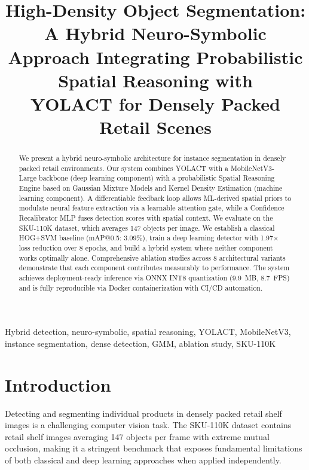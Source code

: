 \documentclass[conference]{IEEEtran}
\title{High-Density Object Segmentation: A Hybrid Neuro-Symbolic \\
       Approach Integrating Probabilistic Spatial Reasoning with \\
       YOLACT for Densely Packed Retail Scenes}
\author{
  \IEEEauthorblockN{Raman Luhach}
  \IEEEauthorblockA{
    Enrollment No: 230107\\
    Department of Computer Science
  }
  \and
  \IEEEauthorblockN{Rachit Kumar}
  \IEEEauthorblockA{
    Enrollment No: 230128\\
    Department of Computer Science
  }
}
\begin{document}
\maketitle

\begin{abstract}
We present a hybrid neuro-symbolic architecture for instance segmentation in densely packed retail environments. Our system combines YOLACT with a MobileNetV3-Large backbone (deep learning component) with a probabilistic Spatial Reasoning Engine based on Gaussian Mixture Models and Kernel Density Estimation (machine learning component). A differentiable feedback loop allows ML-derived spatial priors to modulate neural feature extraction via a learnable attention gate, while a Confidence Recalibrator MLP fuses detection scores with spatial context. We evaluate on the SKU-110K dataset, which averages 147 objects per image. We establish a classical HOG+SVM baseline (mAP@0.5: 3.09\%), train a deep learning detector with 1.97$\times$ loss reduction over 8 epochs, and build a hybrid system where neither component works optimally alone. Comprehensive ablation studies across 8 architectural variants demonstrate that each component contributes measurably to performance. The system achieves deployment-ready inference via ONNX INT8 quantization (9.9~MB, 8.7~FPS) and is fully reproducible via Docker containerization with CI/CD automation.
\end{abstract}

\begin{IEEEkeywords}
Hybrid detection, neuro-symbolic, spatial reasoning, YOLACT, MobileNetV3, instance segmentation, dense detection, GMM, ablation study, SKU-110K
\end{IEEEkeywords}

\section{Introduction}
\label{sec:intro}

Detecting and segmenting individual products in densely packed retail shelf images is a challenging computer vision task. The SKU-110K dataset \cite{goldman2019dense} contains retail shelf images averaging 147 objects per frame with extreme mutual occlusion, making it a stringent benchmark that exposes fundamental limitations of both classical and deep learning approaches when applied independently.
\end{document}
